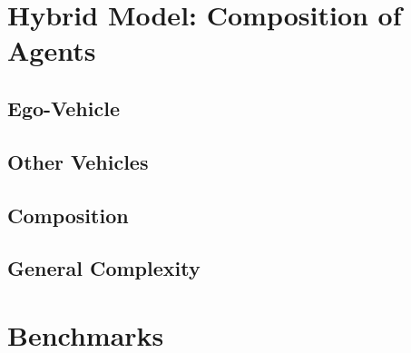 \documentclass{easychair}
\theoremstyle{theorem}
\theoremstyle{remark}
\begin{document}
\section{Hybrid Model: Composition of Agents}
\subsection{Ego-Vehicle}
\subsection{Other Vehicles}
\subsection{Composition}
\subsection{General Complexity}


\section{Benchmarks}
\end{document}
